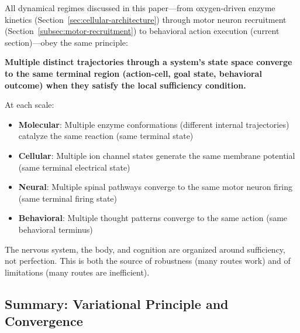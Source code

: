 \begin{principle}
\label{prin:universal-sufficiency}
All dynamical regimes discussed in this paper---from oxygen-driven enzyme kinetics (Section~\ref{sec:cellular-architecture}) through motor neuron recruitment (Section~\ref{subsec:motor-recruitment}) to behavioral action execution (current section)---obey the same principle:

\textbf{Multiple distinct trajectories through a system's state space converge to the same terminal region (action-cell, goal state, behavioral outcome) when they satisfy the local sufficiency condition.}

At each scale:
\begin{itemize}[noitemsep]
\item \textbf{Molecular}: Multiple enzyme conformations (different internal trajectories) catalyze the same reaction (same terminal state)
\item \textbf{Cellular}: Multiple ion channel states generate the same membrane potential (same terminal electrical state)
\item \textbf{Neural}: Multiple spinal pathways converge to the same motor neuron firing (same terminal firing state)
\item \textbf{Behavioral}: Multiple thought patterns converge to the same action (same behavioral terminus)
\end{itemize}

The nervous system, the body, and cognition are organized around sufficiency, not perfection. This is both the source of robustness (many routes work) and of limitations (many routes are inefficient).
\end{principle}

\subsection{Summary: Variational Principle and Convergence}
\label{subsec:variational-summary}

